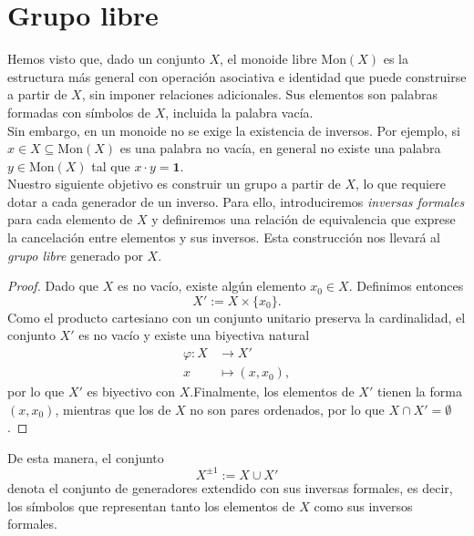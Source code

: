 \section{Grupo libre}

\noindent Hemos visto que, dado un conjunto \(X\), el monoide libre \(\mathrm{Mon}(X)\) es la estructura más general con operación asociativa e identidad que puede construirse a partir de \(X\), sin imponer relaciones adicionales. Sus elementos son palabras formadas con símbolos de \(X\), incluida la palabra vacía.\\

\noindent Sin embargo, en un monoide no se exige la existencia de inversos. Por ejemplo, si \(x \in X \subseteq \mathrm{Mon}(X)\) es una palabra no vacía, en general no existe una palabra \(y \in \mathrm{Mon}(X)\) tal que \(x \cdot y = \mathbf{1}\).\\

\noindent Nuestro siguiente objetivo es construir un grupo a partir de \(X\), lo que requiere dotar a cada generador de un inverso. Para ello, introduciremos \emph{inversas formales} para cada elemento de \(X\) y definiremos una relación de equivalencia que exprese la cancelación entre elementos y sus inversos. Esta construcción nos llevará al \emph{grupo libre} generado por \(X\).


\begin{proposicion}\label{lkjhgkjhg}
\end{proposicion}


\begin{proof}
	Dado que \(X\) es no vacío, existe algún elemento \(x_0 \in X\). Definimos entonces
	\[
	X' := X \times \{x_0\}.
	\]
	Como el producto cartesiano con un conjunto unitario preserva la cardinalidad, el conjunto \(X'\) es no vacío y existe una biyectiva natural
	\[
	\begin{aligned}
		\varphi : X &\longrightarrow X' \\
		x &\longmapsto (x,x_0),
	\end{aligned}
	\]
	por lo que \(X'\) es biyectivo con \(X\).Finalmente, los elementos de \(X'\) tienen la forma \((x,x_0)\), mientras que los de \(X\) no son pares ordenados, por lo que \(X \cap X' = \emptyset\).
\end{proof}




\begin{definicion}
\end{definicion}
 De esta manera, el conjunto
\[
X^{\pm 1} := X \cup X'
\]
denota el conjunto de generadores extendido con sus inversas formales, es decir, los símbolos que representan tanto los elementos de $X$ como sus inversos formales.

